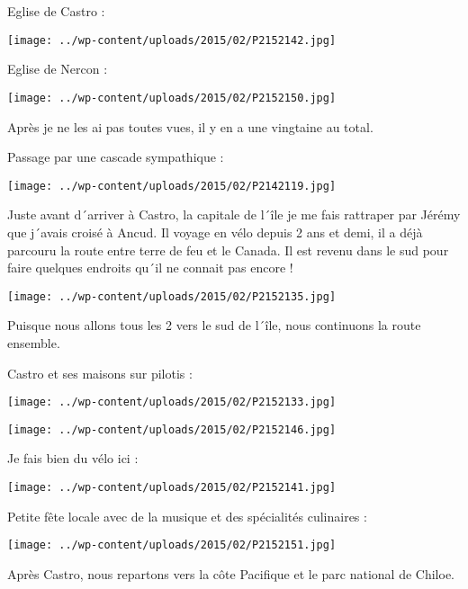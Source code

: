  Eglise de Castro :
\begin{center} \texttt{[image: ../wp-content/uploads/2015/02/P2152142.jpg]} \end{center}

 Eglise de Nercon :
\begin{center} \texttt{[image: ../wp-content/uploads/2015/02/P2152150.jpg]} \end{center}

 Après je ne les ai pas toutes vues, il y en a une vingtaine au total.

 Passage par une cascade sympathique :
\begin{center} \texttt{[image: ../wp-content/uploads/2015/02/P2142119.jpg]} \end{center}

 Juste avant d´arriver à Castro, la capitale de l´île je me fais rattraper par Jérémy que j´avais croisé à Ancud. Il voyage en vélo depuis 2 ans et demi, il a déjà parcouru la route entre terre de feu et le Canada. Il est revenu dans le sud pour faire quelques endroits qu´il ne connait pas encore !
\begin{center} \texttt{[image: ../wp-content/uploads/2015/02/P2152135.jpg]} \end{center}

 Puisque nous allons tous les 2 vers le sud de l´île, nous continuons la route ensemble.

 Castro et ses maisons sur pilotis :
\begin{center} \texttt{[image: ../wp-content/uploads/2015/02/P2152133.jpg]} \end{center}
\begin{center} \texttt{[image: ../wp-content/uploads/2015/02/P2152146.jpg]} \end{center}

 Je fais bien du vélo ici :
\begin{center} \texttt{[image: ../wp-content/uploads/2015/02/P2152141.jpg]} \end{center}

\pagebreak
 Petite fête locale avec de la musique et des spécialités culinaires :
\begin{center} \texttt{[image: ../wp-content/uploads/2015/02/P2152151.jpg]} \end{center}

 Après Castro, nous repartons vers la côte Pacifique et le parc national de Chiloe.

